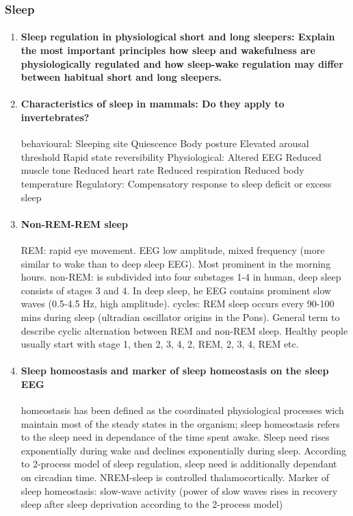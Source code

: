 \documentclass[12pt,article,oneside,a4paper]{memoir}
\begin{document}
\subsubsection{Sleep}
\begin{enumerate}
\item \paragraph{Sleep regulation in physiological short and long sleepers: Explain the most important principles how sleep and wakefulness are physiologically regulated and how sleep-wake regulation may differ between habitual short and long sleepers.}

\item \paragraph{Characteristics of sleep in mammals: Do they apply to invertebrates?}
behavioural:
Sleeping site 
Quiescence
Body posture
Elevated arousal threshold
Rapid state reversibility
Physiological:
Altered EEG
Reduced muscle tone
Reduced heart rate
Reduced respiration
Reduced body temperature
Regulatory:
Compensatory response to sleep deficit or excess sleep

\item \paragraph{Non-REM-REM sleep}

REM: rapid eye movement. EEG low amplitude, mixed frequency (more similar to wake than to deep sleep EEG). Most prominent in the morning hours.
non-REM: is subdivided into four substages 1-4 in human, deep sleep consists of stages 3 and 4. In deep sleep, he EEG contains prominent slow waves (0.5-4.5 Hz, high amplitude).
cycles: REM sleep occurs every 90-100 mins during sleep (ultradian oscillator origins in the Pons). General term to describe cyclic alternation between REM and non-REM sleep. Healthy people usually start with stage 1, then 2, 3, 4, 2, REM, 2, 3, 4, REM etc.

\item \paragraph{Sleep homeostasis and marker of sleep homeostasis on the sleep EEG}

homeostasis has been defined as the coordinated physiological processes wich maintain most of the steady states in the organism; sleep homeostasis refers to the sleep need in dependance of the time spent awake. Sleep need rises exponentially during wake and declines exponentially during sleep. According to 2-process model of sleep regulation, sleep need is additionally dependant on circadian time.
	NREM-sleep is controlled thalamocortically.
        	Marker of sleep homeostasis: slow-wave activity (power of slow waves rises in recovery sleep after sleep deprivation according to the 2-process model)


\end{enumerate}
\end{document}
